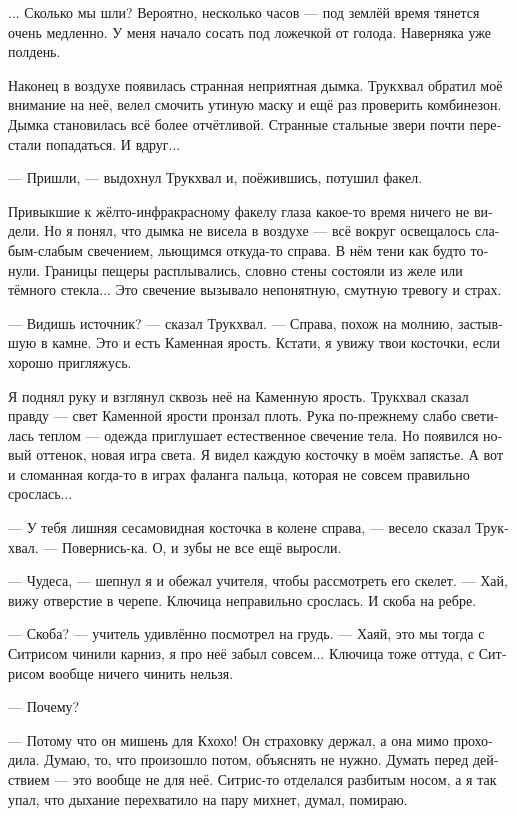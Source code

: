 \documentclass[a4paper,12pt,fleqn]{book}\usepackage{cooltooltips}\usepackage{polyglossia}\setdefaultlanguage[babelshorthands=true]{russian}\setotherlanguage{english}\defaultfontfeatures{Ligatures=TeX,Mapping=tex-text} \usepackage{xcolor}\definecolor{lightgray}{HTML}{bbbbbb}\color{lightgray}\newcommand{\ml}[3]{\textenglish{\textcolor{black}{#3}}}
\begin{document}
{... Сколько мы шли?
Вероятно, несколько часов --- под землёй время тянется очень медленно.
У меня начало сосать под ложечкой от голода.
Наверняка уже полдень.

Наконец в воздухе появилась странная неприятная дымка.
Трукхвал обратил моё внимание на неё, велел смочить утиную маску и ещё раз проверить комбинезон.
Дымка становилась всё более отчётливой.
Странные стальные звери почти перестали попадаться.
И вдруг...

--- Пришли, --- выдохнул Трукхвал и, поёжившись, потушил факел.

Привыкшие к жёлто-инфракрасному факелу глаза какое-то время ничего не видели.
Но я понял, что дымка не висела в воздухе --- всё вокруг освещалось слабым-слабым свечением, льющимся откуда-то справа.
В нём тени как будто тонули.
Границы пещеры расплывались, словно стены состояли из желе или тёмного стекла...
Это свечение вызывало непонятную, смутную тревогу и страх.

--- Видишь источник? --- сказал Трукхвал.
--- Справа, похож на молнию, застывшую в камне.
Это и есть Каменная ярость.
Кстати, я увижу твои косточки, если хорошо пригляжусь.

Я поднял руку и взглянул сквозь неё на Каменную ярость.
Трукхвал сказал правду --- свет Каменной ярости пронзал плоть.
Рука по-прежнему слабо светилась теплом --- одежда приглушает естественное свечение тела.
Но появился новый оттенок, новая игра света.
Я видел каждую косточку в моём запястье.
А вот и сломанная когда-то в играх фаланга пальца, которая не совсем правильно срослась...

--- У тебя лишняя сесамовидная косточка в колене справа, --- весело сказал Трукхвал.
--- Повернись-ка.
О, и зубы не все ещё выросли.

--- Чудеса, --- шепнул я и обежал учителя, чтобы рассмотреть его скелет.
--- Хай, вижу отверстие в черепе.
Ключица неправильно срослась.
И скоба на ребре.

--- Скоба? --- учитель удивлённо посмотрел на грудь.
--- Хаяй, это мы тогда с Ситрисом чинили карниз, я про неё забыл совсем...
Ключица тоже оттуда, с Ситрисом вообще ничего чинить нельзя.

--- Почему?

--- Потому что он мишень для Кхохо!
Он страховку держал, а она мимо проходила.
Думаю, то, что произошло потом, объяснять не нужно.
Думать перед действием --- это вообще не для неё.
Ситрис-то отделался разбитым носом, а я так упал, что дыхание перехватило на пару михнет, думал, помираю.

}
\end{document}
